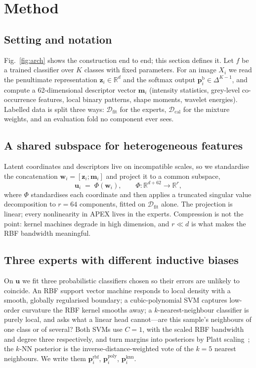 \documentclass[conference]{IEEEtran}
\begin{document}
\section{Method}

\subsection{Setting and notation}
Fig.~\ref{fig:arch} shows the construction end to end; this section defines it.
Let $f$ be a trained classifier over $K$ classes with fixed parameters. For an
image $X_i$ we read the penultimate representation
$\mathbf{z}_i \in \mathbb{R}^{d}$ and the softmax output
$\mathbf{p}^{\mathrm{b}}_i \in \Delta^{K-1}$, and compute a 62-dimensional
descriptor vector $\mathbf{m}_i$ (intensity statistics, grey-level co-occurrence
features, local binary patterns, shape moments, wavelet energies). Labelled data is
split three ways: $\mathcal{D}_{\mathrm{fit}}$ for the experts,
$\mathcal{D}_{\mathrm{cal}}$ for the mixture weights, and an evaluation fold no
component ever sees.

\subsection{A shared subspace for heterogeneous features}
Latent coordinates and descriptors live on incompatible scales, so we standardise
the concatenation $\mathbf{w}_i = [\mathbf{z}_i ; \mathbf{m}_i]$ and project it to
a common subspace,
\begin{equation}
\mathbf{u}_i \;=\; \Phi\!\left( \mathbf{w}_i \right),
\qquad \Phi : \mathbb{R}^{d+62} \rightarrow \mathbb{R}^{r},
\label{eq:proj}
\end{equation}
where $\Phi$ standardises each coordinate and then applies a truncated singular
value decomposition to $r = 64$ components, fitted on $\mathcal{D}_{\mathrm{fit}}$
alone. The projection is linear; every nonlinearity in APEX lives in the experts.
Compression is not the point: kernel machines degrade in high dimension, and
$r \ll d$ is what makes the RBF bandwidth meaningful.

\subsection{Three experts with different inductive biases}
On $\mathbf{u}$ we fit three probabilistic classifiers chosen so their errors are
unlikely to coincide. An RBF support vector machine responds to local density with
a smooth, globally regularised boundary; a cubic-polynomial SVM captures low-order
curvature the RBF kernel smooths away; a $k$-nearest-neighbour classifier is purely
local, and asks what a linear head cannot---are this sample's neighbours of one
class or of several? Both SVMs use $C=1$, with the scaled RBF bandwidth and degree
three respectively, and turn margins into posteriors by Platt
scaling~\cite{platt1999probabilistic}; the $k$-NN posterior is the
inverse-distance-weighted vote of the $k=5$ nearest neighbours. We write them $\mathbf{p}^{\mathrm{rbf}}_i$,
$\mathbf{p}^{\mathrm{poly}}_i$, $\mathbf{p}^{\mathrm{knn}}_i$.
\end{document}
